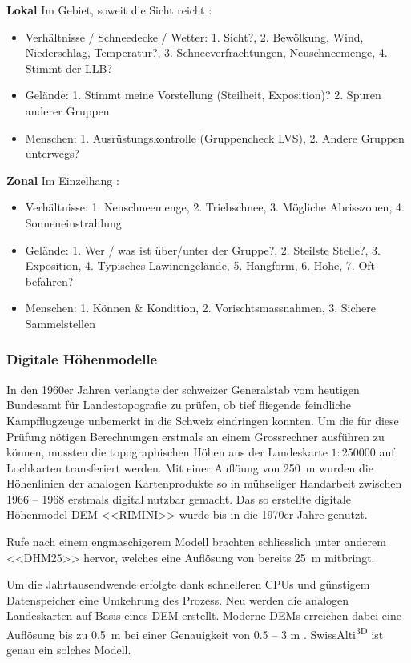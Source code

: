 \textbf{Lokal} Im Gebiet, soweit die Sicht reicht \cite{munter}\cite{redbull3x3}:
\begin{itemize}
  \item Verhältnisse / Schneedecke / Wetter: 1. Sicht?, 2. Bewölkung, Wind, Niederschlag, Temperatur?, 3. Schneeverfrachtungen, Neuschneemenge, 4. Stimmt der LLB?
  \item Gelände: 1. Stimmt meine Vorstellung (Steilheit, Exposition)? 2. Spuren anderer Gruppen
  \item Menschen: 1. Ausrüstungskontrolle (Gruppencheck LVS), 2. Andere Gruppen unterwegs?
\end{itemize}
\textbf{Zonal} Im Einzelhang \cite{munter}\cite{redbull3x3}:
\begin{itemize}
  \item Verhältnisse: 1. Neuschneemenge, 2. Triebschnee, 3. Mögliche Abrisszonen, 4. Sonneneinstrahlung
  \item Gelände: 1. Wer / was ist über/unter der Gruppe?, 2. Steilste Stelle?, 3. Exposition, 4. Typisches Lawinengelände, 5. Hangform, 6. Höhe, 7. Oft befahren?
  \item Menschen: 1. Können \& Kondition, 2. Vorischtsmassnahmen, 3. Sichere Sammelstellen
\end{itemize}

\vfill
\subsubsection{Digitale Höhenmodelle}

In den 1960er Jahren verlangte der schweizer Generalstab vom heutigen Bundesamt für Landestopografie zu prüfen, ob tief fliegende feindliche Kampfflugzeuge unbemerkt in die Schweiz eindringen konnten. Um die für diese Prüfung nötigen Berechnungen erstmals an einem Grossrechner ausführen zu können, mussten die topographischen Höhen aus der Landeskarte $1:250000$ auf Lochkarten transferiert werden. Mit einer Auflöung von \qty{250}{m} wurden die Höhenlinien der analogen Kartenprodukte so in mühseliger Handarbeit zwischen 1966 -- 1968 erstmals digital nutzbar gemacht. Das so erstellte digitale Höhenmodel DEM <<RIMINI>> wurde bis in die 1970er Jahre genutzt. \cite{swisstopohistdem}

Rufe nach einem engmaschigerem Modell brachten schliesslich unter anderem <<DHM25>> hervor, welches eine Auflösung von bereits \qty{25}{m} mitbringt. \cite{swisstopohistdem}

Um die Jahrtausendwende erfolgte dank schnelleren CPUs und günstigem Datenspeicher eine Umkehrung des Prozess. Neu werden die analogen Landeskarten auf Basis eines DEM erstellt. Moderne DEMs erreichen dabei eine Auflösung bis zu \qty{0.5}{m} bei einer Genauigkeit von 0.5 -- 3 \unit{m} \cite{alti3dprod}. SwissAlti\textsuperscript{3D} ist genau ein solches Modell.


